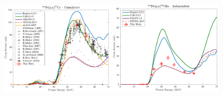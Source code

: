 \begin{figure}
 
 \includegraphics[width=0.49\textwidth]{./figures/51Cr_cum.pdf}
 \includegraphics[width=0.49\textwidth]{./figures/52gMn.pdf}

\vspace{-20pt} 
\end{figure}





